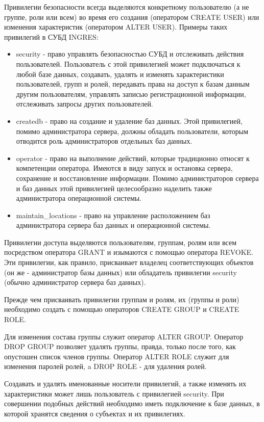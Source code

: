 Привилегии безопасности всегда выделяются конкретному пользователю (а не группе, роли или всем) во
время его создания (оператором CREATE USER) или изменения характеристик (оператором ALTER USER).
Примеры таких привилегий в СУБД INGRES:
\begin{itemize}
    \item security - право управлять безопасностью СУБД и отслеживать действия
        пользователей. Пользователь с этой привилегией может подключаться к любой базе
        данных, создавать, удалять и изменять характеристики пользователей, групп и ролей,
        передавать права на доступ к базам данным другим пользователям, управлять
        записью регистрационной информации, отслеживать запросы других пользователей.
    \item createdb - право на создание и удаление баз данных. Этой привилегией,
        помимо администратора сервера, должны обладать пользователи, которым отводится
        роль администраторов отдельных баз данных.
    \item operator - право на выполнение действий, которые традиционно относят к
        компетенции оператора. Имеются в виду запуск и остановка сервера, сохранение и
        восстановление информации. Помимо администраторов сервера и баз данных этой
        привилегией целесообразно наделить также администратора операционной системы.
    \item maintain\_locations - право на управление расположением баз администратора
        сервера баз данных и операционной системы.
\end{itemize}

Привилегии доступа выделяются пользователям, группам, ролям или всем посредством оператора GRANT и
изымаются с помощью оператора REVOKE. Эти привилегии, как правило, присваивает владелец
соответствующих объектов (он же - администратор базы данных) или обладатель привилегии security
(обычно администратор сервера баз данных).

Прежде чем присваивать привилегии группам и ролям, их (группы и роли) необходимо создать с помощью
операторов CREATE GROUP и CREATE ROLE.

Для изменения состава группы служит оператор ALTER GROUP. Оператор DROP GROUP позволяет удалять
группы, правда, только после того, как опустошен список членов группы. Оператор ALTER ROLE служит
для изменения паролей ролей, a DROP ROLE - для удаления ролей.

Создавать и удалять именованные носители привилегий, а также изменять их характеристики может лишь
пользователь с привилегией security. При совершении подобных действий необходимо иметь подключение
к базе данных, в которой хранятся сведения о субъектах и их привилегиях.


